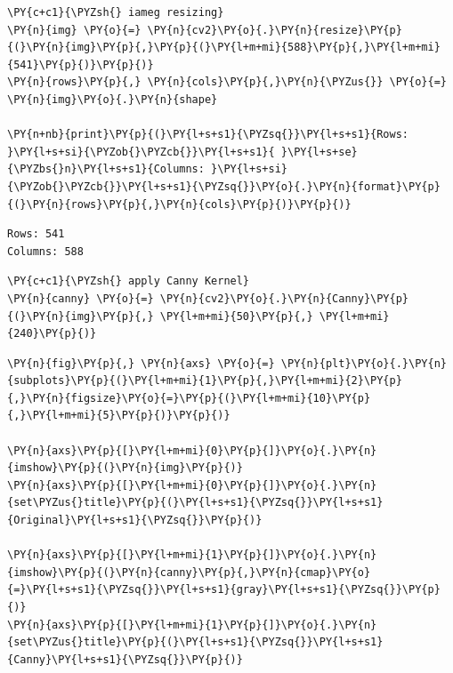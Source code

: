 \begin{tcolorbox}[breakable, size=fbox, boxrule=1pt, pad at break*=1mm,colback=cellbackground, colframe=cellborder]
	\begin{Verbatim}[commandchars=\\\{\}]
\PY{c+c1}{\PYZsh{} iameg resizing}
\PY{n}{img} \PY{o}{=} \PY{n}{cv2}\PY{o}{.}\PY{n}{resize}\PY{p}{(}\PY{n}{img}\PY{p}{,}\PY{p}{(}\PY{l+m+mi}{588}\PY{p}{,}\PY{l+m+mi}{541}\PY{p}{)}\PY{p}{)}
\PY{n}{rows}\PY{p}{,} \PY{n}{cols}\PY{p}{,}\PY{n}{\PYZus{}} \PY{o}{=} \PY{n}{img}\PY{o}{.}\PY{n}{shape}

\PY{n+nb}{print}\PY{p}{(}\PY{l+s+s1}{\PYZsq{}}\PY{l+s+s1}{Rows: }\PY{l+s+si}{\PYZob{}\PYZcb{}}\PY{l+s+s1}{ }\PY{l+s+se}{\PYZbs{}n}\PY{l+s+s1}{Columns: }\PY{l+s+si}{\PYZob{}\PYZcb{}}\PY{l+s+s1}{\PYZsq{}}\PY{o}{.}\PY{n}{format}\PY{p}{(}\PY{n}{rows}\PY{p}{,}\PY{n}{cols}\PY{p}{)}\PY{p}{)}
	\end{Verbatim}
\end{tcolorbox}

\begin{Verbatim}[commandchars=\\\{\}]
Rows: 541
Columns: 588
\end{Verbatim}

\begin{tcolorbox}[breakable, size=fbox, boxrule=1pt, pad at break*=1mm,colback=cellbackground, colframe=cellborder]
	\begin{Verbatim}[commandchars=\\\{\}]
\PY{c+c1}{\PYZsh{} apply Canny Kernel}
\PY{n}{canny} \PY{o}{=} \PY{n}{cv2}\PY{o}{.}\PY{n}{Canny}\PY{p}{(}\PY{n}{img}\PY{p}{,} \PY{l+m+mi}{50}\PY{p}{,} \PY{l+m+mi}{240}\PY{p}{)}
	\end{Verbatim}
\end{tcolorbox}

\begin{tcolorbox}[breakable, size=fbox, boxrule=1pt, pad at break*=1mm,colback=cellbackground, colframe=cellborder]
	\begin{Verbatim}[commandchars=\\\{\}]
\PY{n}{fig}\PY{p}{,} \PY{n}{axs} \PY{o}{=} \PY{n}{plt}\PY{o}{.}\PY{n}{subplots}\PY{p}{(}\PY{l+m+mi}{1}\PY{p}{,}\PY{l+m+mi}{2}\PY{p}{,}\PY{n}{figsize}\PY{o}{=}\PY{p}{(}\PY{l+m+mi}{10}\PY{p}{,}\PY{l+m+mi}{5}\PY{p}{)}\PY{p}{)}

\PY{n}{axs}\PY{p}{[}\PY{l+m+mi}{0}\PY{p}{]}\PY{o}{.}\PY{n}{imshow}\PY{p}{(}\PY{n}{img}\PY{p}{)}
\PY{n}{axs}\PY{p}{[}\PY{l+m+mi}{0}\PY{p}{]}\PY{o}{.}\PY{n}{set\PYZus{}title}\PY{p}{(}\PY{l+s+s1}{\PYZsq{}}\PY{l+s+s1}{Original}\PY{l+s+s1}{\PYZsq{}}\PY{p}{)}

\PY{n}{axs}\PY{p}{[}\PY{l+m+mi}{1}\PY{p}{]}\PY{o}{.}\PY{n}{imshow}\PY{p}{(}\PY{n}{canny}\PY{p}{,}\PY{n}{cmap}\PY{o}{=}\PY{l+s+s1}{\PYZsq{}}\PY{l+s+s1}{gray}\PY{l+s+s1}{\PYZsq{}}\PY{p}{)}
\PY{n}{axs}\PY{p}{[}\PY{l+m+mi}{1}\PY{p}{]}\PY{o}{.}\PY{n}{set\PYZus{}title}\PY{p}{(}\PY{l+s+s1}{\PYZsq{}}\PY{l+s+s1}{Canny}\PY{l+s+s1}{\PYZsq{}}\PY{p}{)}
	\end{Verbatim}
\end{tcolorbox}

